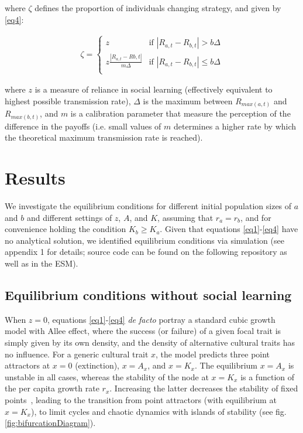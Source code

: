 \documentclass[preprint,authoryear]{elsarticle}
\begin{document}
where $\zeta$ defines the proportion of individuals changing strategy, and given by \eqref{eq4}:

\begin{align}
\label{eq4}
\zeta = 
\begin{cases}
z& \text{if }|R_{a,t}-R_{b,t}| > b\Delta\\
z\frac{|R_{a,t}-R{b,t}|}{m\Delta}& \text{if }|R_{a,t}-R_{b,t}| \leq b\Delta\\
\end{cases}
\end{align}

where $z$ is a measure of reliance in social learning (effectively equivalent to highest possible transmission rate), $\Delta$ is the maximum between $R_{max(a,t)}$ and $R_{max(b,t)}$, and $m$ is a calibration parameter that measure the perception of the difference in the payoffs (i.e. small values of $m$ determines a higher rate by which the theoretical maximum transmission rate is reached). 

\section{Results}

We investigate the equilibrium conditions for different initial population sizes of  $a$ and $b$ and different settings of $z$, $A$, and $K$, assuming that  $r_a=r_b$, and for convenience holding the condition $K_b \geq K_a$. Given that equations \ref{eq1}-\ref{eq4} have no analytical solution, we identified equilibrium conditions via simulation (see appendix 1 for details; source code can be found on the following repository %
as well as in the ESM).  

\subsection{Equilibrium conditions without social learning}

When $z=0$, equations \ref{eq1}-\ref{eq4} \emph{de facto} portray a standard cubic growth model with Allee effect, where the success (or failure) of a given focal trait is simply given by its own density, and the density of alternative cultural traits has no influence. For a generic cultural trait $x$, the model predicts three point attractors at $x=0$ (extinction), $x=A_x$, and $x=K_x$. The equilibrium $x=A_x$ is unstable in all cases, whereas the stability of the node at $x=K_x$ is a function of the per capita growth rate $r_x$. Increasing the latter decreases the stability of fixed points~\citep{scheuring_1999}, leading to the transition from point attractors (with equilibrium at $x=K_x$), to limit cycles and chaotic dynamics with islands of stability (see fig. \ref{fig:bifurcationDiagram}). %
\end{document}
